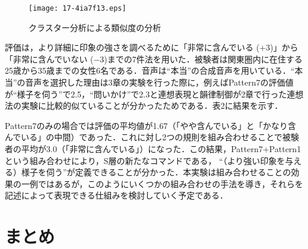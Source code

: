 \documentclass[japanese]{jnlp_1.4}
\begin{document}
\begin{figure}[t]
  \setlength{\captionwidth}{0.45\textwidth}
 \begin{minipage}{0.45\textwidth}
  \begin{center}
 \texttt{[image: 17-4ia7f13.eps]}
  \end{center}
  \caption{クラスター分析による類似度の分析}
  \label{fig:ten}
 \end{minipage}
\hfill
 \begin{minipage}{0.45\textwidth}
  \makeatletter
  \def\@captype{}
  \makeatother
{}

 \end{minipage}
\end{figure}


評価は，より詳細に印象の強さを調べるために「非常に含んでいる ($+3$)」から「非常に含んでいない ($-3$)までの7件法\cite{Psychology}を用いた．被験者は関東圏内に在住する25歳から35歳までの女性6名である．音声は“本当”の合成音声を用いている．“本当”の音声を選択した理由は3章の実験を行った際に，例えばPattern7の評価値が“様子を伺う”で2.5，“問いかけ”で2.3と連想表現と韻律制御が2章で行った連想法の実験に比較的似ていることが分かったためである．表2に結果を示す．


Pattern7のみの場合では評価の平均値が1.67（「やや含んでいる」と「かなり含んでいる」の中間）であった．これに対し2つの規則を組み合わせることで被験者の平均が3.0（「非常に含んでいる」）になった．この結果，Pattern7+Pattern1という組み合わせにより，S層の新たなコマンドである， “（より強い印象を与える）様子を伺う”が定義できることが分かった．本実験は組み合わせることの効果の一例ではあるが，このようにいくつかの組み合わせの手法を導き，それらを記述によって表現できる仕組みを検討していく予定である．



\section{まとめ}
\end{document}
